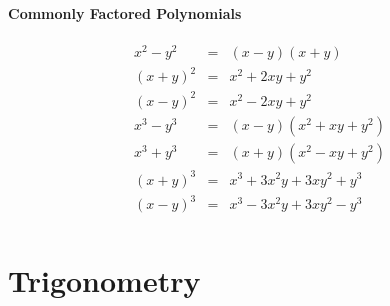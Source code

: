 \documentclass[12pt]{article}
\begin{document}
\paragraph{Commonly Factored Polynomials}

$$
\begin{array}{lcl}
		{x^2-y^2} &=& (x-y)(x+y) \\
		{(x+y)^2} &=& x^2+2xy+y^2\\
		{(x-y)^2} &=& x^2-2xy+y^2\\	
		{x^3-y^3} &=& (x-y)(x^2+xy+y^2)\\
		{x^3+y^3} &=& (x+y)(x^2-xy+y^2)\\
		{(x+y)^3} &=& x^3+3x^2y+3xy^2+y^3\\
		{(x-y)^3} &=& x^3-3x^2y+3xy^2-y^3\\
\end{array}
$$



\section{Trigonometry}
\end{document}
